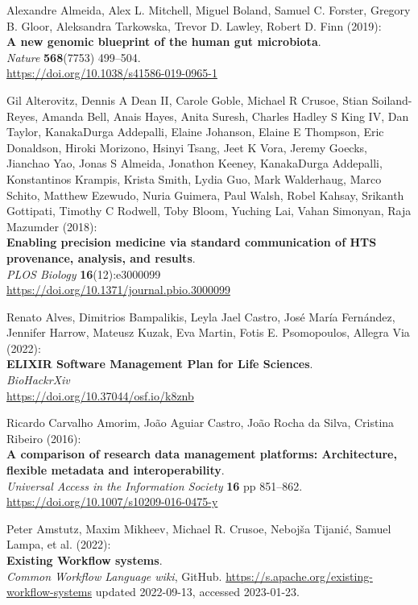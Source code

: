 \begin{thebibliography}{9}
Alexandre Almeida, Alex L. Mitchell, Miguel Boland, Samuel C.
Forster, Gregory B. Gloor, Aleksandra Tarkowska, Trevor D. Lawley,
Robert D. Finn (2019):\\
\textbf{A new genomic blueprint of the human gut microbiota}.\\
\emph{Nature} \textbf{568}(7753) 499--504.\\
\url{https://doi.org/10.1038/s41586-019-0965-1}

Gil Alterovitz, Dennis A Dean II, Carole Goble, Michael R
Crusoe, Stian Soiland-Reyes, Amanda Bell, Anais Hayes, Anita Suresh,
Charles Hadley S King IV, Dan Taylor, KanakaDurga Addepalli, Elaine
Johanson, Elaine E Thompson, Eric Donaldson, Hiroki Morizono, Hsinyi
Tsang, Jeet K Vora, Jeremy Goecks, Jianchao Yao, Jonas S Almeida,
Jonathon Keeney, KanakaDurga Addepalli, Konstantinos Krampis, Krista
Smith, Lydia Guo, Mark Walderhaug, Marco Schito, Matthew Ezewudo, Nuria
Guimera, Paul Walsh, Robel Kahsay, Srikanth Gottipati, Timothy C
Rodwell, Toby Bloom, Yuching Lai, Vahan Simonyan, Raja Mazumder
(2018):\\
\textbf{Enabling precision medicine via standard communication of HTS
provenance, analysis, and results}.\\
\emph{PLOS Biology} \textbf{16}(12):e3000099\\
\url{https://doi.org/10.1371/journal.pbio.3000099}

Renato Alves, Dimitrios Bampalikis, Leyla Jael Castro,
José María Fernández, Jennifer Harrow, Mateusz Kuzak, Eva Martin, Fotis
E. Psomopoulos, Allegra Via (2022):\\
\textbf{ELIXIR Software Management Plan for Life Sciences}.\\
\emph{BioHackrXiv}\\
\url{https://doi.org/10.37044/osf.io/k8znb}

Ricardo Carvalho Amorim, João Aguiar Castro, João Rocha da
Silva, Cristina Ribeiro (2016):\\
\textbf{A comparison of research data management platforms:
Architecture, flexible metadata and interoperability}.\\
\emph{Universal Access in the Information Society} \textbf{16} pp
851--862.\\
\url{https://doi.org/10.1007/s10209-016-0475-y}

Peter Amstutz, Maxim Mikheev, Michael R. Crusoe, Nebojša Tijanić, Samuel Lampa, et al. (2022):\\
\textbf{Existing Workflow systems}.\\
\emph{Common Workflow Language wiki}, GitHub. 
\url{https://s.apache.org/existing-workflow-systems} updated 2022-09-13, accessed 2023-01-23.


\end{thebibliography}
